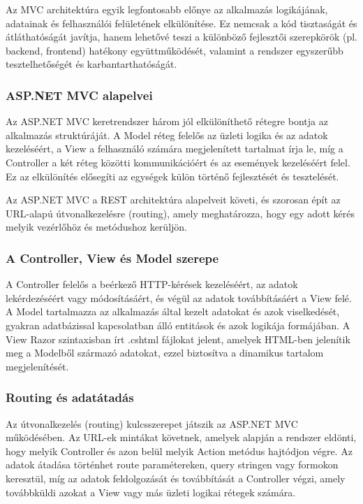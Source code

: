 Az MVC architektúra egyik legfontosabb előnye az alkalmazás logikájának, adatainak és felhasználói felületének elkülönítése. Ez nemcsak a kód tisztaságát és átláthatóságát javítja, hanem lehetővé teszi a különböző fejlesztői szerepkörök (pl. backend, frontend) hatékony együttműködését, valamint a rendszer egyszerűbb tesztelhetőségét és karbantarthatóságát.

\subsubsection{ASP.NET MVC alapelvei}

\indent Az ASP.NET MVC keretrendszer három jól elkülöníthető rétegre bontja az alkalmazás struktúráját. A Model réteg felelős az üzleti logika és az adatok kezeléséért, a View a felhasználó számára megjelenített tartalmat írja le, míg a Controller a két réteg közötti kommunikációért és az események kezeléséért felel. Ez az elkülönítés elősegíti az egységek külön történő fejlesztését és tesztelését.

Az ASP.NET MVC a REST architektúra alapelveit követi, és szorosan épít az URL-alapú útvonalkezelésre (routing), amely meghatározza, hogy egy adott kérés melyik vezérlőhöz és metódushoz kerüljön.

\subsubsection{A Controller, View és Model szerepe}

\indent A Controller felelős a beérkező HTTP-kérések kezeléséért, az adatok lekérdezéséért vagy módosításáért, és végül az adatok továbbításáért a View felé. A Model tartalmazza az alkalmazás által kezelt adatokat és azok viselkedését, gyakran adatbázissal kapcsolatban álló entitások és azok logikája formájában. A View Razor szintaxisban írt .cshtml fájlokat jelent, amelyek HTML-ben jelenítik meg a Modelből származó adatokat, ezzel biztosítva a dinamikus tartalom megjelenítését.

\subsubsection{Routing és adatátadás}

\indent Az útvonalkezelés (routing) kulcsszerepet játszik az ASP.NET MVC működésében. Az URL-ek mintákat követnek, amelyek alapján a rendszer eldönti, hogy melyik Controller és azon belül melyik Action metódus hajtódjon végre. Az adatok átadása történhet route paramétereken, query stringen vagy formokon keresztül, míg az adatok feldolgozását és továbbítását a Controller végzi, amely továbbküldi azokat a View vagy más üzleti logikai rétegek számára.

